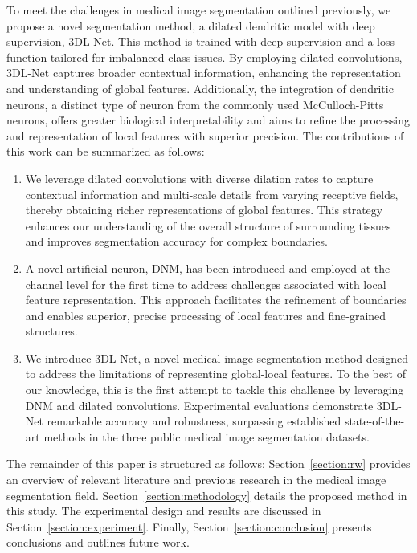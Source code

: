 \documentclass[review]{elsarticle}
\begin{document}
	To meet the challenges in medical image segmentation outlined previously, we propose a novel segmentation method, a dilated dendritic model with deep supervision, 3DL-Net. This method is trained with deep supervision and a loss function tailored for imbalanced class issues. By employing dilated convolutions, 3DL-Net captures broader contextual information, enhancing the representation and understanding of global features. Additionally, the integration of dendritic neurons, a distinct type of neuron from the commonly used McCulloch-Pitts neurons, offers greater biological interpretability and aims to refine the processing and representation of local features with superior precision. The contributions of this work can be summarized as follows:

	\begin{enumerate}[1)]
		\item We leverage dilated convolutions with diverse dilation rates to capture contextual information and multi-scale details from varying receptive fields, thereby obtaining richer representations of global features. This strategy enhances our understanding of the overall structure of surrounding tissues and improves segmentation accuracy for complex boundaries.
		
		\item A novel artificial neuron, DNM, has been introduced and employed at the channel level for the first time to address challenges associated with local feature representation. This approach facilitates the refinement of boundaries and enables superior, precise processing of local features and fine-grained structures.
		
		\item We introduce 3DL-Net, a novel medical image segmentation method designed to address the limitations of representing global-local features. To the best of our knowledge, this is the first attempt to tackle this challenge by leveraging DNM and dilated convolutions. Experimental evaluations demonstrate 3DL-Net remarkable accuracy and robustness, surpassing established state-of-the-art methods in the three public medical image segmentation datasets.
	\end{enumerate}

	The remainder of this paper is structured as follows: Section~\ref{section:rw} provides an overview of relevant literature and previous research in the medical image segmentation field. Section~\ref{section:methodology} details the proposed method in this study. The experimental design and results are discussed in Section~\ref{section:experiment}. Finally, Section~\ref{section:conclusion} presents conclusions and outlines future work.
	
\end{document}
